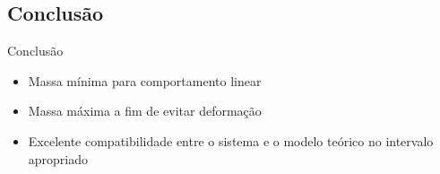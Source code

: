 \documentclass[xcolor=x11names,compress]{beamer}
\renewcommand{\(}{\begin{columns}}
\renewcommand{\)}{\end{columns}}
\newcommand{\<}[1]{\begin{column}{#1}}
\renewcommand{\>}{\end{column}}
\begin{document}
\subsection{Conclusão}

\begin{frame}{Conclusão}
    \begin{itemize}
        \item Massa mínima para comportamento linear
        \item Massa máxima a fim de evitar deformação
        \item Excelente compatibilidade entre o sistema e o modelo teórico no intervalo apropriado
    \end{itemize}
\end{frame}
\end{document}

